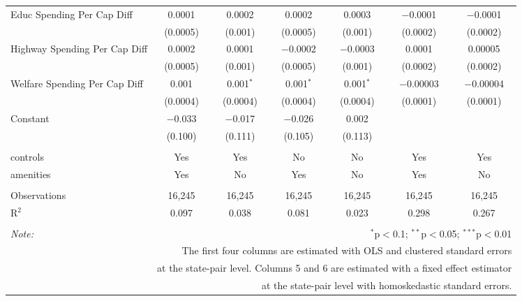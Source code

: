 \begin{table}[!htbp]
\begin{tabular}{@{\extracolsep{5pt}}lcccccc}
  Educ Spending Per Cap Diff & 0.0001 & 0.0002 & 0.0002 & 0.0003 & $-$0.0001 & $-$0.0001 \\ 
  & (0.0005) & (0.001) & (0.0005) & (0.001) & (0.0002) & (0.0002) \\ 
  Highway Spending Per Cap Diff & 0.0002 & 0.0001 & $-$0.0002 & $-$0.0003 & 0.0001 & 0.00005 \\ 
  & (0.0005) & (0.001) & (0.0005) & (0.001) & (0.0002) & (0.0002) \\ 
  Welfare Spending Per Cap Diff & 0.001 & 0.001$^{*}$ & 0.001$^{*}$ & 0.001$^{*}$ & $-$0.00003 & $-$0.00004 \\ 
  & (0.0004) & (0.0004) & (0.0004) & (0.0004) & (0.0001) & (0.0001) \\ 
  Constant & $-$0.033 & $-$0.017 & $-$0.026 & 0.002 &  &  \\ 
  & (0.100) & (0.111) & (0.105) & (0.113) &  &  \\ 
 \hline \\[-1.8ex] 
controls & Yes & Yes & No & No & Yes & Yes \\ 
amenities & Yes & No & Yes & No & Yes & No \\ 
\hline \\[-1.8ex] 
Observations & 16,245 & 16,245 & 16,245 & 16,245 & 16,245 & 16,245 \\ 
R$^{2}$ & 0.097 & 0.038 & 0.081 & 0.023 & 0.298 & 0.267 \\ 
\hline 
\hline \\[-1.8ex] 
\textit{Note:}  & \multicolumn{6}{r}{$^{*}$p$<$0.1; $^{**}$p$<$0.05; $^{***}$p$<$0.01} \\ 
 & \multicolumn{6}{r}{The first four columns are estimated with OLS and clustered standard errors} \\ 
 & \multicolumn{6}{r}{at the state-pair level. Columns 5 and 6 are estimated with a fixed effect estimator} \\ 
 & \multicolumn{6}{r}{at the state-pair level with homoskedastic standard errors.} \\ 
\end{tabular} 
\end{table} 
